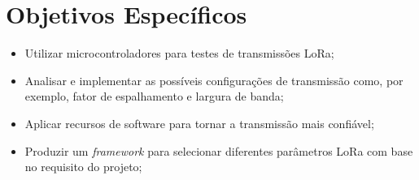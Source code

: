 \documentclass[
	12pt,				%
	openright,			%
	twoside,			%
	a4paper,			%
	english,			%
	french,				%
	spanish,			%
	brazil				%
	]{abntex2}
\begin{document}
\section{Objetivos Específicos}

\begin{itemize}
    \item Utilizar microcontroladores para testes de transmissões LoRa;
    \item Analisar e implementar as possíveis configurações de transmissão como, por exemplo, fator de espalhamento e largura de banda;
    \item Aplicar recursos de software para tornar a transmissão mais confiável;
    \item Produzir um \emph{framework} para selecionar diferentes parâmetros LoRa com base no requisito do projeto;
\end{itemize}

\end{document}

